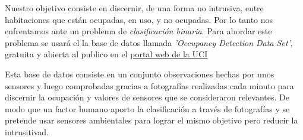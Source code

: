 \documentclass{article}
\begin{document}
Nuestro objetivo consiste en discernir, de una forma no intrusiva, entre habitaciones que están ocupadas, en uso, y no ocupadas. Por lo tanto nos enfrentamos ante un problema de \textit{clasificación binaria}. Para abordar este problema se usará el la base de datos llamada \textit{'Occupancy Detection Data Set'}, gratuita y abierta al publico en el  \href{https://archive.ics.uci.edu/ml/datasets/Occupancy+Detection+/}{\color{blue}portal web de la UCI}

Esta base de datos consiste en un conjunto observaciones hechas por unos sensores y luego comprobadas gracias a fotografías realizadas cada minuto para discernir la ocupación y valores de sensores que se consideraron relevantes. De modo que un factor humano aporto la clasificación a través de fotografías y se pretende usar sensores ambientales para lograr el mismo objetivo pero reducir la intrusitivad.






\end{document}
